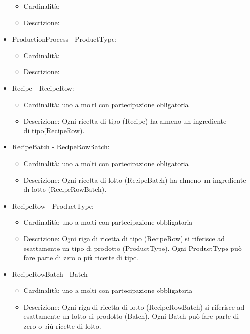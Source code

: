 \documentclass[a4paper,11pt]{article}
\begin{document}
\begin{itemize}
        \begin{itemize}
          \item Cardinalità:
          \item Descrizione:
        \end{itemize}
  \item ProductionProcess - ProductType:
        \begin{itemize}
          \item Cardinalità:
          \item Descrizione:
        \end{itemize}
  \item Recipe - RecipeRow:
        \begin{itemize}
          \item Cardinalità: uno a molti con partecipazione obligatoria
          \item Descrizione: Ogni ricetta di tipo (Recipe) ha almeno un ingrediente \\ di tipo(RecipeRow).
        \end{itemize}
  \item RecipeBatch - RecipeRowBatch:
        \begin{itemize}
          \item Cardinalità: uno a molti con partecipazione obligatoria
          \item Descrizione: Ogni ricetta di lotto (RecipeBatch) ha almeno un ingrediente di lotto (RecipeRowBatch).
        \end{itemize}
  \item RecipeRow - ProductType:
        \begin{itemize}
          \item Cardinalità: uno a molti con partecipazione obbligatoria
          \item Descrizione: Ogni riga di ricetta di tipo (RecipeRow) si riferisce ad esattamente un tipo di prodotto (ProductType). Ogni ProductType può fare parte di zero o più ricette di tipo.
        \end{itemize}
  \item RecipeRowBatch - Batch
        \begin{itemize}
          \item Cardinalità: uno a molti con partecipazione obbligatoria
          \item Descrizione: Ogni riga di ricetta di lotto (RecipeRowBatch) si riferisce ad esattamente un lotto di prodotto (Batch). Ogni Batch può fare parte di zero o più ricette di lotto.

\end{itemize}
\end{itemize}
\end{document}
